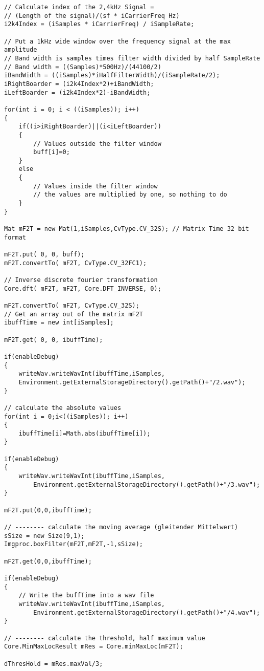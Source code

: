 \documentclass[10pt]{article}
\begin{document}
\begin{lstlisting}
// Calculate index of the 2,4kHz Signal =
// (Length of the signal)/(sf * iCarrierFreq Hz) 
i2k4Index = (iSamples * iCarrierFreq) / iSampleRate;
					
// Put a 1kHz wide window over the frequency signal at the max amplitude 
// Band width is samples times filter width divided by half SampleRate 
// Band width = ((Samples)*500Hz)/(44100/2)
iBandWidth = ((iSamples)*iHalfFilterWidth)/(iSampleRate/2);
iRightBoarder = (i2k4Index*2)+iBandWidth;
iLeftBoarder = (i2k4Index*2)-iBandWidth;
		
for(int i = 0; i < ((iSamples)); i++)
{
	if((i>iRightBoarder)||(i<iLeftBoarder))
	{
		// Values outside the filter window
		buff[i]=0;
	}
	else
	{
		// Values inside the filter window
		// the values are multiplied by one, so nothing to do
	}
}
		
Mat mF2T = new Mat(1,iSamples,CvType.CV_32S); // Matrix Time 32 bit format
		
mF2T.put( 0, 0, buff);
mF2T.convertTo( mF2T, CvType.CV_32FC1);
		
// Inverse discrete fourier transformation
Core.dft( mF2T, mF2T, Core.DFT_INVERSE, 0);
		
mF2T.convertTo( mF2T, CvType.CV_32S);
// Get an array out of the matrix mF2T
ibuffTime = new int[iSamples];

mF2T.get( 0, 0, ibuffTime);
		
if(enableDebug)
{
	writeWav.writeWavInt(ibuffTime,iSamples,
	Environment.getExternalStorageDirectory().getPath()+"/2.wav");
}
				
// calculate the absolute values
for(int i = 0;i<((iSamples)); i++)
{
	ibuffTime[i]=Math.abs(ibuffTime[i]);
}
		
if(enableDebug)
{
	writeWav.writeWavInt(ibuffTime,iSamples,
		Environment.getExternalStorageDirectory().getPath()+"/3.wav");
}
				
mF2T.put(0,0,ibuffTime); 
								
// -------- calculate the moving average (gleitender Mittelwert)
sSize = new Size(9,1);
Imgproc.boxFilter(mF2T,mF2T,-1,sSize);
				
mF2T.get(0,0,ibuffTime);
		
if(enableDebug)
{
	// Write the buffTime into a wav file
	writeWav.writeWavInt(ibuffTime,iSamples,
		Environment.getExternalStorageDirectory().getPath()+"/4.wav");
}

// -------- calculate the threshold, half maximum value
Core.MinMaxLocResult mRes = Core.minMaxLoc(mF2T);
		
dThresHold = mRes.maxVal/3;
		

\end{lstlisting}
\end{document}

